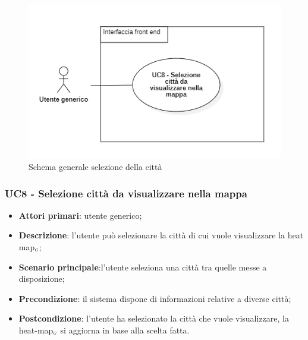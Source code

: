 \begin{center}
	\begin{figure}[H]
		\centering\includegraphics[scale=0.8]{../immagini/attori_casi/UC_8.png}
		\caption{Schema generale selezione della città}
	\end{figure}
\end{center}


\subsubsection{UC8 - Selezione città da visualizzare nella mappa}\label{CasiDUsoCasiDUsoTraUnUtenteEIlFrontEndElencoCasiDUsoUC4SelezioneCittaDaVisualizzareNellaMappa}

\begin{itemize}
	\item \textbf{Attori primari}: utente generico;
	\item \textbf{Descrizione}:  l’utente può selezionare la città di cui vuole visualizzare la heat map$_{\scaleto{G}{3pt}}$;
	\item \textbf{Scenario principale}:l’utente seleziona una città tra quelle messe a disposizione;
	\item \textbf{Precondizione}: il sistema dispone di informazioni relative a diverse città;
	\item \textbf{Postcondizione}:   l’utente ha selezionato la città che vuole visualizzare, la heat-map$_{\scaleto{G}{3pt}}$ si aggiorna in base alla scelta fatta.
\end{itemize}

